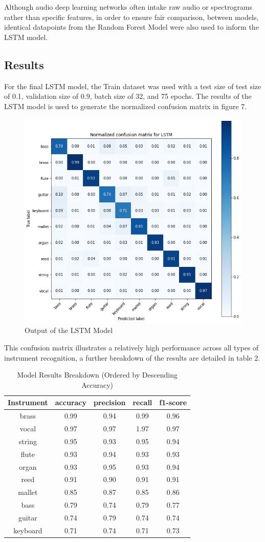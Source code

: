 \documentclass{article}
\begin{document}
Although audio deep learning networks often intake raw audio or spectrograms rather than specific features, in order to ensure fair comparison, between models, identical datapoints from the Random Forest Model were also used to inform the LSTM model.

\subsection{Results}
For the final LSTM model, the Train dataset was used with a test size of test size of 0.1, validation size of 0.9, batch size of 32, and 75 epochs.  The results of the LSTM model is used to generate the normalized confusion matrix in figure 7.

\begin{figure}[htb]
  \centering
  \includegraphics[width=.6\linewidth]{cm_lstm}
  \caption{Output of the LSTM Model}
\end{figure}

This confusion matrix illustrates a relatively high performance across all types of instrument recognition, a further breakdown of the results are detailed in table 2. 

\begin{table}[htb]
  \caption{Model Results Breakdown (Ordered by Descending Accuracy)}
  \label{results-table}
  \centering
  \begin{tabular}{ccccc}
    \toprule
    Instrument & accuracy & precision & recall & f1-score  \\
    \midrule
    brass & 0.99 & 0.94 & 0.99 & 0.96\\
    vocal & 0.97 & 0.97 & 1.97 & 0.97\\
    string & 0.95 & 0.93 & 0.95 & 0.94\\
    flute & 0.93 & 0.94 & 0.93 & 0.93\\
    organ & 0.93 & 0.95 & 0.93 & 0.94\\
    reed & 0.91 & 0.90 & 0.91 & 0.91\\
    mallet & 0.85 & 0.87 & 0.85 & 0.86\\
    bass & 0.79 & 0.74 & 0.79 & 0.77\\
    guitar & 0.74 & 0.79 & 0.74 & 0.74\\
    keyboard & 0.71 & 0.74 & 0.71 & 0.73\\
    \bottomrule
  \end{tabular}
\end{table}
\end{document}
